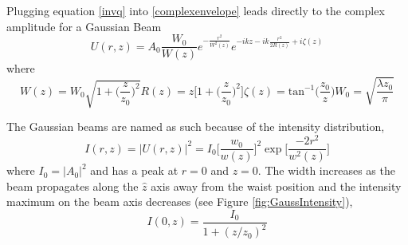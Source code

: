 		Plugging equation \ref{invq} into \ref{complexenvelope} leads directly to the complex amplitude for a Gaussian Beam
		\begin{equation}
		U(r,z) = A_0 \frac{W_0}{W(z)} e^{-\frac{r^2}{W^2(z)}} e^{-ikz - ik \frac{r^2}{2R(z)} + i \zeta(z)}
		\end{equation}
		where
		\begin{subequations}
		\begin{equation}
		W(z) = W_0 \sqrt{1 + \bigg( \frac{z}{z_0} \bigg)^2}
		\end{equation}
		\begin{equation}\label{ROC}
		R(z) = z \bigg[ 1 + \bigg( \frac{z}{z_0} \bigg)^2 \bigg]
		\end{equation}
		\begin{equation}\label{gouy}
		\zeta(z)= \text{tan}^{-1}\bigg(\frac{z_0}{z}\bigg)
		\end{equation}
		\begin{equation}
		W_0 = \sqrt{\frac{\lambda z_0}{\pi}}
		\end{equation}
		\end{subequations}\label{eq:gauss_params}
	
		The Gaussian beams are named as such because of the intensity distribution,
		\begin{equation}
		I(r,z) = \vert U(r,z) |^2 = I_0 \bigg[ \frac{w_0}{w(z)}\bigg]^2 \exp \bigg[ \frac{-2 r^2}{w^2(z)}\bigg]
		\end{equation}
		where $I_0 = \vert A_0\vert^2$ and has a peak at $r=0$ and $z=0$.  The width increases as the beam propagates along the $\hat{z}$ axis away from the waist position and the intensity maximum on the beam axis decreases (see Figure \ref{fig:GaussIntensity}),
		\begin{equation}
		I(0,z) = \frac{I_0}{1 + (z/z_0)^2}
		\end{equation}
		
